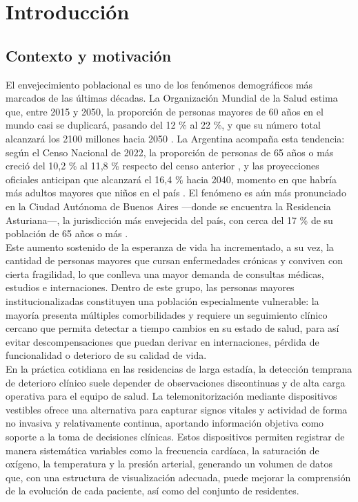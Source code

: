 
\section{Introducción}

\subsection{Contexto y motivación}
El envejecimiento poblacional es uno de los fenómenos demográficos más marcados de las últimas décadas. La Organización Mundial de la Salud estima que, entre 2015 y 2050, la proporción de personas mayores de 60 años en el mundo casi se duplicará, pasando del 12 \% al 22 \%, y que su número total alcanzará los 2100 millones hacia 2050 \cite{who_ageing}. La Argentina acompaña esta tendencia: según el Censo Nacional de 2022, la proporción de personas de 65 años o más creció del 10,2 \% al 11,8 \% respecto del censo anterior \cite{indec_censo2022}, y las proyecciones oficiales anticipan que alcanzará el 16,4 \% hacia 2040, momento en que habría más adultos mayores que niños en el país \cite{indec_proyecciones}. El fenómeno es aún más pronunciado en la Ciudad Autónoma de Buenos Aires —donde se encuentra la Residencia Asturiana—, la jurisdicción más envejecida del país, con cerca del 17 \% de su población de 65 años o más \cite{indec_censo2022}.\\

Este aumento sostenido de la esperanza de vida ha incrementado, a su vez, la cantidad de personas mayores que cursan enfermedades crónicas y conviven con cierta fragilidad, lo que conlleva una mayor demanda de consultas médicas, estudios e internaciones. Dentro de este grupo, las personas mayores institucionalizadas constituyen una población especialmente vulnerable: la mayoría presenta múltiples comorbilidades y requiere un seguimiento clínico cercano que permita detectar a tiempo cambios en su estado de salud, para así evitar descompensaciones que puedan derivar en internaciones, pérdida de funcionalidad o deterioro de su calidad de vida.\\

En la práctica cotidiana en las residencias de larga estadía, la detección temprana de deterioro clínico suele depender de observaciones discontinuas y de alta carga operativa para el equipo de salud. La telemonitorización mediante dispositivos vestibles ofrece una alternativa para capturar signos vitales y actividad de forma no invasiva y relativamente continua, aportando información objetiva como soporte a la toma de decisiones clínicas. Estos dispositivos permiten registrar de manera sistemática variables como la frecuencia cardíaca, la saturación de oxígeno, la temperatura y la presión arterial, generando un volumen de datos que, con una estructura de visualización adecuada, puede mejorar la comprensión de la evolución de cada paciente, así como del conjunto de residentes.\\


